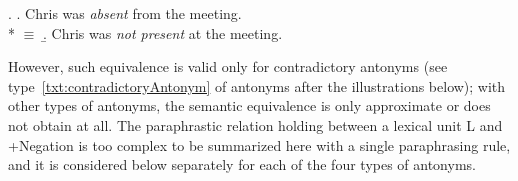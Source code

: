 \begingroup

\ex. \a. Chris was \emph{absent} from the meeting.\\*
         $\equiv$
     \b. Chris was \emph{not present} at the meeting.

\endgroup

However, such equivalence is valid only for contradictory antonyms (see type~\ref{txt:contradictoryAntonym} of antonyms after the illustrations below); with other types of antonyms, the semantic equivalence is only approximate or does not obtain at all. The paraphrastic relation holding between a lexical unit L and \thinspace+\thinspace{}Negation is too complex to be summarized here with a single paraphrasing rule, and it is considered below separately for each of the four types of antonyms.

